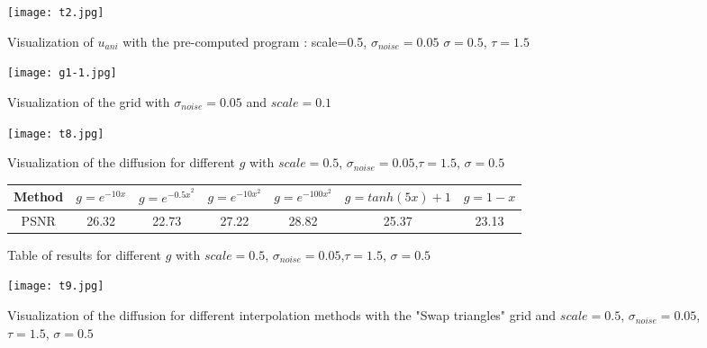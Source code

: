 \documentclass{report}
\begin{document}
          \begin{figure}
          	\label{t2}
          	\caption{Visualization of $u_{ani}$ with the pre-computed program : scale=0.5, $\sigma_{noise}=0.05$  $\sigma=0.5$, $\tau=1.5$ }
          	\centering
          	\texttt{[image: t2.jpg]}
          \end{figure}
          
 
 
 
 
 
 \begin{figure}[h!]
 	\label{g1-1}
 	\caption{Visualization of the grid with ${\sigma}_{noise}=0.05$ and $scale=0.1$}
 	\centering
 	\texttt{[image: g1-1.jpg]}
 \end{figure}


        \begin{figure}
        	\label{t8}
        	\centering
        	\caption{Visualization of the diffusion for different $g$ with $scale=0.5$, $\sigma_{noise}=0.05$,$\tau=1.5$, $\sigma=0.5$ }
        	\texttt{[image: t8.jpg]}
        \end{figure}
        
        
        
        
        
        \begin{figure}[h!]
        	\centering
        	\label{T8}
        	\caption{Table of results for different $g$ with $scale=0.5$, $\sigma_{noise}=0.05$,$\tau=1.5$, $\sigma=0.5$ }
        	\begin{tabular}{|c|c|c|c|c|c|c|}
        		\hline
        		Method & $g= e^{-10 x}$ & $g= e^{-{0.5 x}^2}$ & $g= e^{-{10 x}^2}$ & $g= e^{-{100 x}^2}$ & $g= tanh(5 x)+1$ & $g= 1-x$  \\
        		\hline
        		PSNR  & 26.32 & 22.73 & 27.22 & 28.82 & 25.37 & 23.13 \\
        		\hline
        	\end{tabular}
        \end{figure}
        
        
        
        \begin{figure}
        	\centering
        	\label{t9}
        	\caption{Visualization of the diffusion for different interpolation methods with the "Swap triangles" grid and $scale=0.5$, $\sigma_{noise}=0.05$,$\tau=1.5$, $\sigma=0.5$ }
        	\texttt{[image: t9.jpg]}
        \end{figure}
\end{document}
